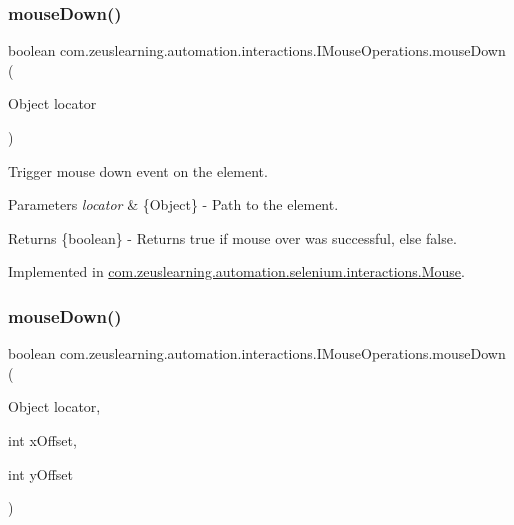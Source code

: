 \subsubsection{\texorpdfstring{mouse\+Down()}{mouseDown()}\hspace{0.1cm}{\footnotesize\ttfamily [1/2]}}
{\footnotesize\ttfamily boolean com.\+zeuslearning.\+automation.\+interactions.\+I\+Mouse\+Operations.\+mouse\+Down (\begin{DoxyParamCaption}\item[{Object}]{locator }\end{DoxyParamCaption})}

Trigger mouse down event on the element.


\begin{DoxyParams}{Parameters}
{\em locator} & \{Object\} -\/ Path to the element. \\
\hline
\end{DoxyParams}
\begin{DoxyReturn}{Returns}
\{boolean\} -\/ Returns {\ttfamily true} if mouse over was successful, else {\ttfamily false}. 
\end{DoxyReturn}


Implemented in \hyperlink{classcom_1_1zeuslearning_1_1automation_1_1selenium_1_1interactions_1_1Mouse_a208023bff8f5799e5e61dfaa190d5feb}{com.\+zeuslearning.\+automation.\+selenium.\+interactions.\+Mouse}.

\hypertarget{interfacecom_1_1zeuslearning_1_1automation_1_1interactions_1_1IMouseOperations_a0a455b9b9ab29fdb0dded00e07e3c72c}{}\label{interfacecom_1_1zeuslearning_1_1automation_1_1interactions_1_1IMouseOperations_a0a455b9b9ab29fdb0dded00e07e3c72c} 
\subsubsection{\texorpdfstring{mouse\+Down()}{mouseDown()}\hspace{0.1cm}{\footnotesize\ttfamily [2/2]}}
{\footnotesize\ttfamily boolean com.\+zeuslearning.\+automation.\+interactions.\+I\+Mouse\+Operations.\+mouse\+Down (\begin{DoxyParamCaption}\item[{Object}]{locator,  }\item[{int}]{x\+Offset,  }\item[{int}]{y\+Offset }\end{DoxyParamCaption})}

